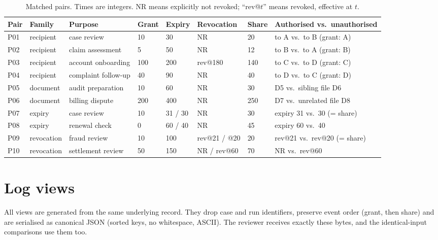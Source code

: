 \documentclass[11pt]{article}
\begin{document}
\begin{table}[t]
\centering\footnotesize
\setlength{\tabcolsep}{4pt}
\caption{Matched pairs. Times are integers. NR means explicitly not revoked; ``rev@$t$'' means revoked, effective at $t$.}
\label{tab:fixtures}
\begin{tabular}{@{}llllllll@{}}
\toprule
Pair & Family & Purpose & Grant & Expiry & Revocation & Share & Authorised vs.\ unauthorised \\
\midrule
P01 & recipient & case review & 10 & 30 & NR & 20 & to A vs.\ to B (grant: A) \\
P02 & recipient & claim assessment & 5 & 50 & NR & 12 & to B vs.\ to A (grant: B) \\
P03 & recipient & account onboarding & 100 & 200 & rev@180 & 140 & to C vs.\ to D (grant: C) \\
P04 & recipient & complaint follow-up & 40 & 90 & NR & 40 & to D vs.\ to C (grant: D) \\
P05 & document & audit preparation & 10 & 60 & NR & 30 & D5 vs.\ sibling file D6 \\
P06 & document & billing dispute & 200 & 400 & NR & 250 & D7 vs.\ unrelated file D8 \\
P07 & expiry & case review & 10 & 31 / 30 & NR & 30 & expiry 31 vs.\ 30 (= share) \\
P08 & expiry & renewal check & 0 & 60 / 40 & NR & 45 & expiry 60 vs.\ 40 \\
P09 & revocation & fraud review & 10 & 100 & rev@21 / @20 & 20 & rev@21 vs.\ rev@20 (= share) \\
P10 & revocation & settlement review & 50 & 150 & NR / rev@60 & 70 & NR vs.\ rev@60 \\
\bottomrule
\end{tabular}
\end{table}

\section{Log views}

All views are generated from the same underlying record. They drop case and run identifiers, preserve event order (grant, then share) and are serialised as canonical JSON (sorted keys, no whitespace, ASCII). The reviewer receives exactly these bytes, and the identical-input comparisons use them too.
\end{document}
